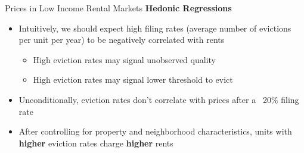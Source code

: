 \documentclass[10pt, xcolor=dvipsnames]{beamer}
\begin{document}
    

\begin{frame}{Prices in Low Income Rental Markets}
\textbf{Hedonic Regressions}
    \begin{itemize}
    \item Intuitively, we should expect high filing rates (average number of evictions per unit per year) to be negatively correlated with rents
    \begin{itemize}
        \item High eviction rates may signal unobserved quality
        \item High eviction rates may signal lower threshold to evict
    \end{itemize}
    \pause
        \item Unconditionally, eviction rates don't correlate with prices after a ~20\% filing rate
        \pause
        \item After controlling for property and neighborhood characteristics, units with \textbf{higher} eviction rates charge \textbf{higher} rents 
    \end{itemize}
\end{frame}
\end{document}
